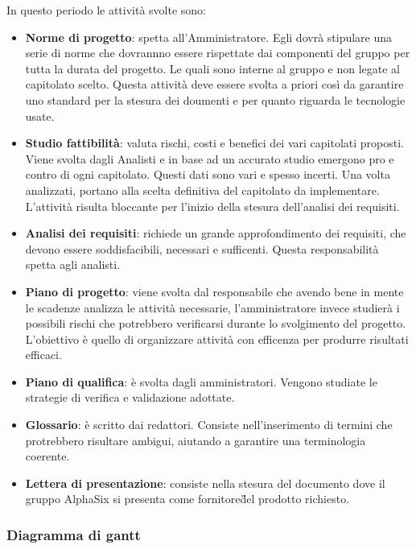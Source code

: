         In questo periodo le attività svolte sono:
		\begin{itemize}
			\item \textbf{Norme di progetto}: spetta all'Amministratore. Egli dovrà stipulare una serie di norme
            che dovrannno essere rispettate dai componenti del gruppo per tutta la durata del progetto\GAlt.
            Le quali sono interne al
            gruppo e non legate al capitolato scelto. Questa attività deve essere svolta a priori così da garantire uno standard
            per la stesura dei doumenti e per quanto riguarda le tecnologie usate.
			\item \textbf{Studio fattibilità}: valuta rischi, costi e benefici dei vari capitolati proposti.
            Viene svolta dagli Analisti e in base ad un accurato studio emergono pro e contro di ogni capitolato. Questi dati
            sono vari e spesso incerti. Una volta analizzati, portano alla scelta definitiva del capitolato da implementare.
            L'attività risulta bloccante per l'inizio della stesura dell'analisi dei requisiti.
			\item \textbf{Analisi dei requisiti}: richiede un grande approfondimento dei requisiti, che devono essere
            soddisfacibili, necessari e sufficenti. Questa responsabilità spetta agli analisti.
			\item \textbf{Piano di progetto}: viene svolta dal responsabile che avendo bene in mente le scadenze analizza le
            attività necessarie, l'amministratore invece studierà i possibili rischi che potrebbero verificarsi durante lo
            svolgimento del progetto. L'obiettivo è quello di organizzare attività con efficenza per produrre risultati efficaci.
			\item \textbf{Piano di qualifica}: è svolta dagli amministratori. Vengono studiate le strategie di verifica
            e validazione adottate.
			\item \textbf{Glossario}: è scritto dai redattori. Consiste nell'inserimento di termini che protrebbero
            risultare ambigui, aiutando a garantire una terminologia coerente.
			\item \textbf{Lettera di presentazione}: consiste nella stesura del documento dove il gruppo AlphaSix si presenta
            come fornitore\G del prodotto richiesto.
		\end{itemize}
		
            \subsubsection{Diagramma di gantt}
